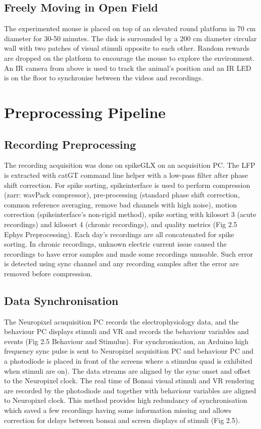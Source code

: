 \subsection{Freely Moving in Open Field}
The experimented mouse is placed on top of an elevated round platform in 70 cm diameter for 30-50 minutes. The disk is surrounded by a 200 cm diameter circular wall with two patches of visual stimuli opposite to each other. Random rewards are dropped on the platform to encourage the mouse to explore the environment. An IR camera from above is used to track the animal's position and an IR LED is on the floor to synchronise between the videos and recordings.



\section{Preprocessing Pipeline}
\subsection{Recording Preprocessing}
The recording acquisition was done on spikeGLX on an acquisition PC. The LFP is extracted with catGT command line helper with a low-pass filter after phase shift correction. For spike sorting, spikeinterface is used to perform compression (zarr: wavPack compressor), pre-processing (standard phase shift correction, common reference averaging, remove bad channels with high noise), motion correction (spikeinterface's non-rigid method), spike sorting with kilosort 3 (acute recordings) and kilosort 4 (chronic recordings), and quality metrics (Fig 2.5 Ephys Preprocessing). Each day's recordings are all concatenated for spike sorting. In chronic recordings, unknown electric current issue caused the recordings to have error samples and made some recordings unusable. Such error is detected using sync channel and any recording samples after the error are removed before compression.

\subsection{Data Synchronisation}
The Neuropixel acuquisition PC records the electrophysiology data, and the behaviour PC displays stimuli and VR and records the behaviour variables and events (Fig 2.5 Behaviour and Stimulus). For synchronisation, an Arduino high frequency sync pulse is sent to Neuropixel acquisition PC and behaviour PC and a photodiode is placed in front of the screens where a stimulus quad is exhibited when stimuli are on). The data streams are aligned by the sync onset and offset to the Neuropixel clock. The real time of Bonsai visual stimuli and VR rendering are recorded by the photodiode and together with behaviour variables are aligned to Neuropixel clock. This method provides high redundancy of synchronisation which saved a few recordings having some information missing and allows correction for delays between bonsai and screen displays of stimuli (Fig 2.5). 

